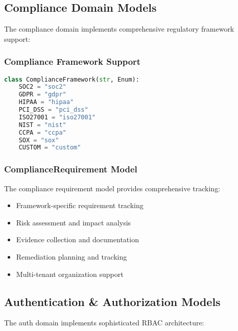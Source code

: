\subsection{Compliance Domain Models}

The compliance domain implements comprehensive regulatory framework support:

\subsubsection{Compliance Framework Support}
\begin{lstlisting}[language=Python, caption=Compliance Framework Enumeration]
class ComplianceFramework(str, Enum):
    SOC2 = "soc2"
    GDPR = "gdpr"
    HIPAA = "hipaa"
    PCI_DSS = "pci_dss"
    ISO27001 = "iso27001"
    NIST = "nist"
    CCPA = "ccpa"
    SOX = "sox"
    CUSTOM = "custom"
\end{lstlisting}

\subsubsection{ComplianceRequirement Model}
The compliance requirement model provides comprehensive tracking:
\begin{itemize}
    \item Framework-specific requirement tracking
    \item Risk assessment and impact analysis
    \item Evidence collection and documentation
    \item Remediation planning and tracking
    \item Multi-tenant organization support
\end{itemize}

\subsection{Authentication \& Authorization Models}

The auth domain implements sophisticated RBAC architecture:

